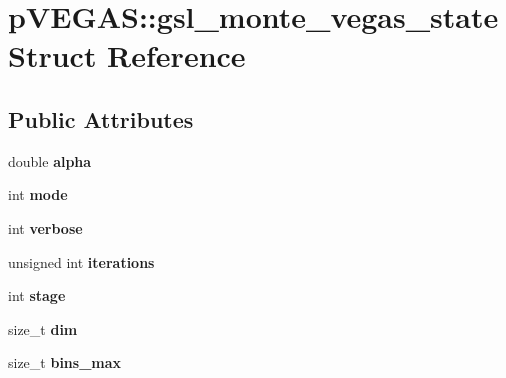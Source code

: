 \hypertarget{structpVEGAS_1_1gsl__monte__vegas__state}{}\section{p\+V\+E\+G\+A\+S\+:\+:gsl\+\_\+monte\+\_\+vegas\+\_\+state Struct Reference}
\label{structpVEGAS_1_1gsl__monte__vegas__state}
\subsection*{Public Attributes}
\begin{DoxyCompactItemize}
\item 
\hypertarget{structpVEGAS_1_1gsl__monte__vegas__state_ad90199fbfe96d952b3ddd5d9ee50d7d6}{}double {\bfseries alpha}\label{structpVEGAS_1_1gsl__monte__vegas__state_ad90199fbfe96d952b3ddd5d9ee50d7d6}

\item 
\hypertarget{structpVEGAS_1_1gsl__monte__vegas__state_a39b883f4a437280c3e5d5b5e07f111a3}{}int {\bfseries mode}\label{structpVEGAS_1_1gsl__monte__vegas__state_a39b883f4a437280c3e5d5b5e07f111a3}

\item 
\hypertarget{structpVEGAS_1_1gsl__monte__vegas__state_acdde9366a7d66391f14c27ad0b96cafa}{}int {\bfseries verbose}\label{structpVEGAS_1_1gsl__monte__vegas__state_acdde9366a7d66391f14c27ad0b96cafa}

\item 
\hypertarget{structpVEGAS_1_1gsl__monte__vegas__state_a5f12f3e4474770bbb6e1d0256e872b09}{}unsigned int {\bfseries iterations}\label{structpVEGAS_1_1gsl__monte__vegas__state_a5f12f3e4474770bbb6e1d0256e872b09}

\item 
\hypertarget{structpVEGAS_1_1gsl__monte__vegas__state_aee953f39aec5f8650863d3cc43efe111}{}int {\bfseries stage}\label{structpVEGAS_1_1gsl__monte__vegas__state_aee953f39aec5f8650863d3cc43efe111}

\item 
\hypertarget{structpVEGAS_1_1gsl__monte__vegas__state_a26732c04d9dbe43bc7421866cb5990c7}{}size\+\_\+t {\bfseries dim}\label{structpVEGAS_1_1gsl__monte__vegas__state_a26732c04d9dbe43bc7421866cb5990c7}

\item 
\hypertarget{structpVEGAS_1_1gsl__monte__vegas__state_a92f422cf2d6586001d785c674cc00bb7}{}size\+\_\+t {\bfseries bins\+\_\+max}\label{structpVEGAS_1_1gsl__monte__vegas__state_a92f422cf2d6586001d785c674cc00bb7}


\end{DoxyCompactItemize}
